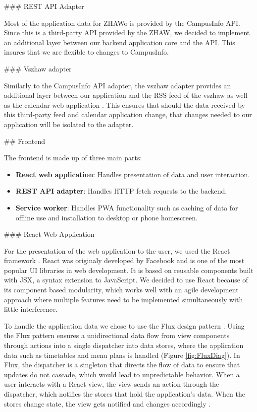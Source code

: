 \begin{markdown}
### REST API Adapter

Most of the application data for ZHAWo is provided by the CampusInfo API. Since this is a third-party API provided by the ZHAW, we decided to implement an additional layer between our backend application core and the API. This insures that we are flexible to changes to CampusInfo.

### Vszhaw adapter

Similarly to the CampusInfo API adapter, the vszhaw adapter provides an additional layer between our application and the RSS feed \cite{VszhawNews} of the vszhaw as well as the calendar web application \cite{VszhawCalendar}. This ensures that should the data received by this third-party feed and calendar application change, that changes needed to our application will be isolated to the adapter.

## Frontend

The frontend is made up of three main parts:

\begin{itemize}
  \item \textbf{React web application}: Handles presentation of data and user interaction.
  \item \textbf{REST API adapter}: Handles HTTP fetch requests to the backend.
  \item \textbf{Service worker}: Handles PWA functionality such as caching of data for offline use and installation to desktop or phone homescreen.
\end{itemize}

### React Web Application

For the presentation of the web application to the user, we used the React framework \cite{React}. React was originaly developed by Facebook and is one of the most popular UI libraries in web development. It is based on reusable components built with JSX, a syntax extension to JavaScript. We decided to use React because of its component based modularity, which works well with an agile development approach where multiple features need to be implemented simultaneously with little interference.

To handle the application data we chose to use the Flux design pattern \cite{Flux}. Using the Flux pattern ensures a unidirectional data flow from view components through actions into a single dispatcher into data stores, where the application data such as timetables and menu plans is handled (Figure \ref{fig:FluxDiag}). In Flux, the dispatcher is a singleton that directs the flow of data to ensure that updates do not cascade, which would lead to unpredictable behavior. When a user interacts with a React view, the view sends an action through the dispatcher, which notifies the stores that hold the application’s data. When the stores change state, the view gets notified and changes accordingly \cite{Flux}.


\end{markdown}
